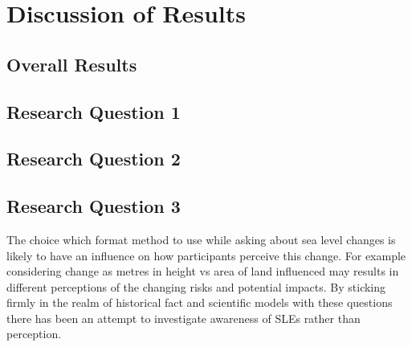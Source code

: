 
\chapter{Discussion of Results}

\section{Overall Results}

\section{Research Question 1}

\section{Research Question 2}


\section{Research Question 3}


The choice which format method to use while asking about sea level changes is likely to have an influence on how participants perceive this change. For example considering change as metres in height vs area of land influenced may results in different perceptions of the changing risks and potential impacts.  By sticking firmly in the realm of historical fact and scientific models with these questions there has been an attempt to investigate awareness of SLEs rather than perception. 